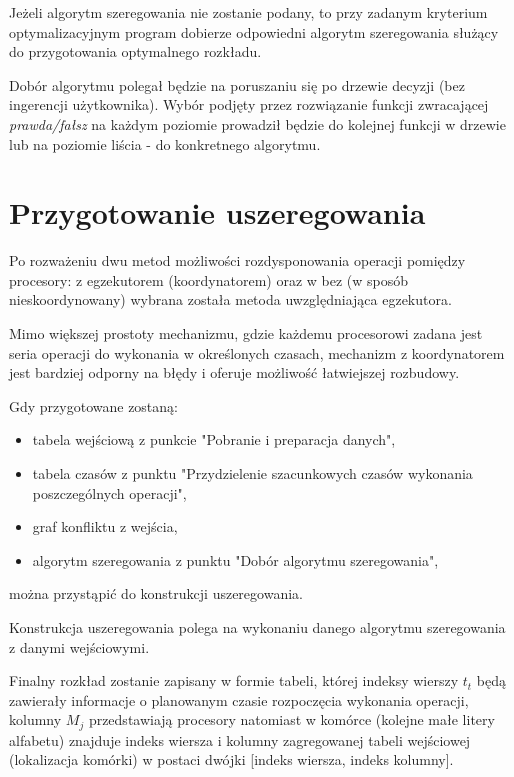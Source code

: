 \documentclass[brudnopis]{xmgr}
\begin{document}
Jeżeli algorytm szeregowania nie zostanie podany, to przy zadanym kryterium optymalizacyjnym program dobierze odpowiedni algorytm szeregowania służący do przygotowania optymalnego rozkładu.
\medskip

Dobór algorytmu polegał będzie na poruszaniu się po drzewie decyzji (bez ingerencji użytkownika).
Wybór podjęty przez rozwiązanie funkcji zwracającej \emph{prawda/fałsz} na każdym poziomie prowadził będzie do kolejnej funkcji w drzewie lub na poziomie liścia - do konkretnego algorytmu.


\section{Przygotowanie uszeregowania}

Po rozważeniu dwu metod możliwości rozdysponowania operacji pomiędzy procesory: z egzekutorem (koordynatorem) oraz w bez (w sposób nieskoordynowany) wybrana została metoda uwzględniająca egzekutora.
\medskip

Mimo większej prostoty mechanizmu, gdzie każdemu procesorowi zadana jest seria operacji do wykonania w określonych czasach, mechanizm z koordynatorem jest bardziej odporny na błędy i oferuje możliwość łatwiejszej rozbudowy.

Gdy przygotowane zostaną:

\begin{itemize}
    \item tabela wejściową z punkcie "Pobranie i preparacja danych",
    \item tabela czasów z punktu "Przydzielenie szacunkowych czasów wykonania poszczególnych operacji",
    \item graf konfliktu z wejścia,
    \item algorytm szeregowania z punktu "Dobór algorytmu szeregowania",
\end{itemize}

można przystąpić do konstrukcji uszeregowania.
\medskip

Konstrukcja uszeregowania polega na wykonaniu danego algorytmu szeregowania z danymi wejściowymi.
\medskip

Finalny rozkład zostanie zapisany w formie tabeli, której indeksy wierszy $t_t$ będą zawierały informacje o planowanym czasie rozpoczęcia wykonania operacji, kolumny $M_j$ przedstawiają procesory natomiast w komórce (kolejne małe litery alfabetu) znajduje indeks wiersza i kolumny zagregowanej tabeli wejściowej (lokalizacja komórki) w postaci dwójki [indeks wiersza, indeks kolumny].
\medskip
\end{document}

